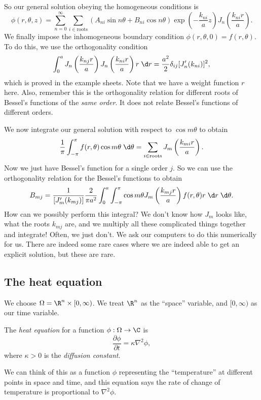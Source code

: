 \documentclass[a4paper]{article}
\begin{document}
So our general solution obeying the homogeneous conditions is
\[
  \phi(r, \theta, z) = \sum_{n = 0}^\infty \sum_{i \in \text{roots}} (A_{ni} \sin n \theta + B_{ni}\cos n\theta) \exp\left(-\frac{k_{ni}}{a}z\right) J_n \left(\frac{k_{ni}r}{a}\right).
\]
We finally impose the inhomogeneous boundary condition $\phi(r, \theta, 0) = f(r, \theta)$. To do this, we use the orthogonality condition
\[
  \int_0^a J_n\left(\frac{k_{nj}r}{a}\right)J_n\left(\frac{k_{ni}r}{a}\right) r\;\d r = \frac{a^2}{2}\delta_{ij}[J_n'(k_{ni})]^2,
\]
which is proved in the example sheets. Note that we have a weight function $r$ here. Also, remember this is the orthogonality relation for different roots of Bessel's functions of the \emph{same order}. It does not relate Bessel's functions of different orders.

We now integrate our general solution with respect to $\cos m\theta$ to obtain
\[
  \frac{1}{\pi}\int_{-\pi}^\pi f(r, \theta) \cos m\theta \;\d \theta = \sum_{i \in \text{roots}} J_m\left(\frac{k_{mi}r}{a}\right).
\]
Now we just have Bessel's function for a single order $j$. So we can use the orthogonality relation for the Bessel's functions to obtain
\[
  B_{mj} = \frac{1}{[J'_m(k_{mj})]}\frac{2}{\pi a^2}\int_0^a \int_{-\pi}^\pi \cos m\theta J_m\left(\frac{k_{mj}r}{a}\right) f(r, \theta)r \;\d r \;\d \theta.
\]
How can we possibly perform this integral? We don't know how $J_m$ looks like, what the roots $k_{mj}$ are, and we multiply all these complicated things together and integrate! Often, we just don't. We ask our computers to do this numerically for us. There are indeed some rare cases where we are indeed able to get an explicit solution, but these are rare.

\subsection{The heat equation}
We choose $\Omega = \R^n \times[0, \infty)$. We treat $\R^n$ as the ``space'' variable, and $[0, \infty)$ as our time variable.
\begin{defi}
  The \emph{heat equation} for a function $\phi: \Omega \to \C$ is
  \[
    \frac{\partial \phi}{\partial t} = \kappa \nabla^2 \phi,
  \]
  where $\kappa > 0$ is the \emph{diffusion constant}.
\end{defi}
We can think of this as a function $\phi$ representing the ``temperature'' at different points in space and time, and this equation says the rate of change of temperature is proportional to $\nabla^2 \phi$.
\end{document}
